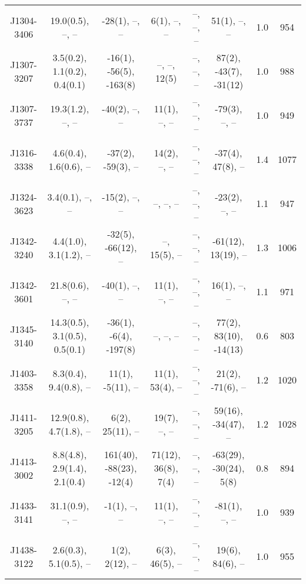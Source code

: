 \documentclass{mnras}
\begin{document}
\begin{table*}
\begin{tabular}{cccccccc}
J1304-3406 & 19.0(0.5), --, -- & -28(1), --, -- & 6(1), --, -- & --, --, -- & 51(1), --, -- & 1.0 & 954 \\ 

J1307-3207 & 3.5(0.2), 1.1(0.2), 0.4(0.1) & -16(1), -56(5), -163(8) & --, --, 12(5) & --, --, -- & 87(2), -43(7), -31(12) & 1.0 & 988 \\ 

J1307-3737 & 19.3(1.2), --, -- & -40(2), --, -- & 11(1), --, -- & --, --, -- & -79(3), --, -- & 1.0 & 949 \\ 

J1316-3338 & 4.6(0.4), 1.6(0.6), -- & -37(2), -59(3), -- & 14(2), --, -- & --, --, -- & -37(4), 47(8), -- & 1.4 & 1077 \\ 

J1324-3623 & 3.4(0.1), --, -- & -15(2), --, -- & --, --, -- & --, --, -- & -23(2), --, -- & 1.1 & 947 \\ 

J1342-3240 & 4.4(1.0), 3.1(1.2), -- & -32(5), -66(12), -- & --, 15(5), -- & --, --, -- & -61(12), 13(19), -- & 1.3 & 1006 \\ 

J1342-3601 & 21.8(0.6), --, -- & -40(1), --, -- & 11(1), --, -- & --, --, -- & 16(1), --, -- & 1.1 & 971 \\ 

J1345-3140 & 14.3(0.5), 3.1(0.5), 0.5(0.1) & -36(1), -6(4), -197(8) & --, --, -- & --, --, -- & 77(2), 83(10), -14(13) & 0.6 & 803 \\ 

J1403-3358 & 8.3(0.4), 9.4(0.8), -- & 11(1), -5(11), -- & 11(1), 53(4), -- & --, --, -- & 21(2), -71(6), -- & 1.2 & 1020 \\ 

J1411-3205 & 12.9(0.8), 4.7(1.8), -- & 6(2), 25(11), -- & 19(7), --, -- & --, --, -- & 59(16), -34(47), -- & 1.2 & 1028 \\ 

J1413-3002 & 8.8(4.8), 2.9(1.4), 2.1(0.4) & 161(40), -88(23), -12(4) & 71(12), 36(8), 7(4) & --, --, -- & -63(29), -30(24), 5(8) & 0.8 & 894 \\ 

J1433-3141 & 31.1(0.9), --, -- & -1(1), --, -- & 11(1), --, -- & --, --, -- & -81(1), --, -- & 1.0 & 939 \\ 

J1438-3122 & 2.6(0.3), 5.1(0.5), -- & 1(2), 2(12), -- & 6(3), 46(5), -- & --, --, -- & 19(6), 84(6), -- & 1.0 & 955 \\ 


\end{tabular}
\end{table*}
\end{document}
